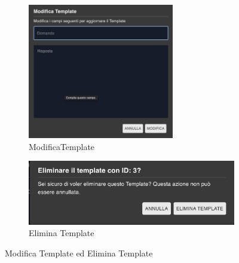 \begin{figure}[h!]
    \centering
    \begin{subfigure}{0.2\textwidth}
        \centering
        \includegraphics[width=0.7\textwidth]{./img/ModificaTemplate.png}
        \caption{ModificaTemplate}
    \end{subfigure}
    \hspace{0.05\textwidth}
    \begin{subfigure}{0.2\textwidth}
        \centering
        \includegraphics[width=\textwidth]{./img/EliminaTemplate.png}
        \caption{Elimina Template}
    \end{subfigure}
    \caption{Modifica Template ed Elimina Template}
    \label{fig:pop-up modifica ed elimina}
\end{figure}

